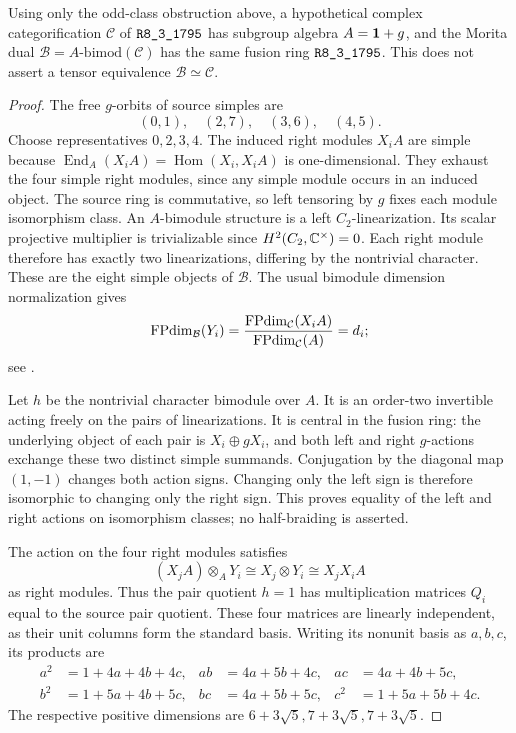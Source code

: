 \begin{proposition}
\label{prop:pointed-r1795-self-ring}
Using only the odd-class obstruction above, a hypothetical complex
categorification $\mathcal C$ of $\sha{R8_3_1795}$ has subgroup algebra
$A=\mathbf1+g$, and the Morita dual $\mathcal B=A\text{-}\mathrm{bimod}(\mathcal C)$
has the same fusion ring $\sha{R8_3_1795}$.  This does not assert a tensor
equivalence $\mathcal B\simeq\mathcal C$.
\end{proposition}
\begin{proof}
The free $g$-orbits of source simples are
\[
 (0,1),\quad(2,7),\quad(3,6),\quad(4,5).
\]
Choose representatives $0,2,3,4$.  The induced right modules $X_iA$
are simple because
$\operatorname{End}_A(X_iA)=\operatorname{Hom}(X_i,X_iA)$ is
one-dimensional.  They exhaust the four simple right modules, since
any simple module occurs in an induced object.  The source ring is
commutative, so left tensoring by $g$ fixes each module isomorphism
class.  An $A$-bimodule structure is a left $C_2$-linearization.
Its scalar projective multiplier is trivializable since
$H^2(C_2,\mathbb C^\times)=0$.  Each right module therefore has exactly two
linearizations, differing by the nontrivial character.  These are the
eight simple objects of $\mathcal B$.  The usual bimodule dimension
normalization gives
\[
 \operatorname{FPdim}_{\mathcal B}(Y_i)
 =\frac{\operatorname{FPdim}_{\mathcal C}(X_iA)}{\operatorname{FPdim}_{\mathcal C}(A)}=d_i;
\]
see \cite[Chapter~7 and Exercise~7.16.9(i)]{EGNO}.

Let $h$ be the nontrivial character bimodule over $A$.  It is an
order-two invertible acting freely on the pairs of linearizations.
It is central in the fusion ring: the underlying object of each pair
is $X_i\oplus gX_i$, and both left and right $g$-actions exchange
these two distinct simple summands.  Conjugation by the diagonal
map $(1,-1)$ changes both action signs.  Changing only the left sign
is therefore isomorphic to changing only the right sign.  This proves
equality of the left and right actions on isomorphism classes; no
half-braiding is asserted.

The action on the four right modules satisfies
\[
 (X_jA)\otimes_A Y_i\cong X_j\otimes Y_i\cong X_jX_iA
\]
as right modules.  Thus the pair quotient $h=1$ has multiplication
matrices $Q_i$ equal to the source pair quotient.  These four matrices
are linearly independent, as their unit columns form the standard basis.
Writing its nonunit basis as $a,b,c$, its products are
\begin{align*}
 a^2&=1+4a+4b+4c,& ab&=4a+5b+4c,& ac&=4a+4b+5c,\\
 b^2&=1+5a+4b+5c,& bc&=4a+5b+5c,& c^2&=1+5a+5b+4c.
\end{align*}
The respective positive dimensions are $6+3\sqrt5,7+3\sqrt5,7+3\sqrt5$.


\end{proof}
